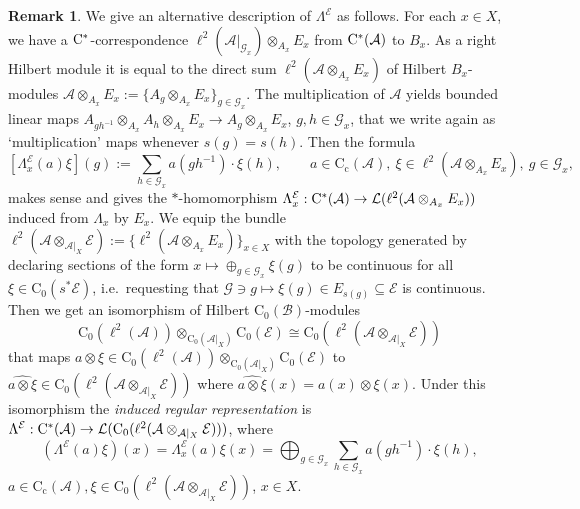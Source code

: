 \documentclass[11 pt, leqno]{amsart}
\numberwithin{equation}{section}
\theoremstyle{plain}
\theoremstyle{definition}
\newtheorem {rem} [thm]{Remark}
\newcommand*{\contc}{\mathrm{C_c}}%
\newcommand*{\contz}{\mathrm{C_0}}%
\newcommand{\B}{\mathcal B}
\newcommand{\LL}{\mathcal L}
\newcommand{\G}{\mathcal G} %
\newcommand{\EE}{\mathcal E}
\newcommand{\A}{\mathcal A}
\newcommand{\cst}{\ifmmode\mathrm{C}^*\else{$\mathrm{C}^*$}\fi}
\begin{document}
\begin{rem}\label{rem:induced_regular_alternative}
We give an alternative description of $\Lambda^{\EE}$ as follows. 
For each $x\in X$, we have a $\cst$-correspondence $\ell^2(\A|_{\G_x})\otimes_{A_x} E_x$ from $\cst(\A)$ to $B_x$. 
As a right Hilbert module it is equal to the direct sum $\ell^2(\A\otimes_{A_x} E_x)$ of Hilbert $B_x$-modules $\A\otimes_{A_x} E_x := \{ A_g\otimes_{A_x}E_x \}_ {g\in \G_x}$. 
The multiplication of $\A$ yields bounded linear maps $A_{gh^{-1}} \otimes_{A_x} A_h \otimes_{A_x} E_x \to A_g \otimes_{A_x} E_x$, $g,h\in \G_x$, that we write again as `multiplication' maps whenever $s(g)=s(h)$. 
Then the formula
\begin{equation}\label{eq:Alcides_formula}
    [\Lambda_{x}^{\EE}(a) \xi](g) := \sum_{h \in \G_x} a(g h^{-1})\cdot \xi(h),\qquad  a\in \contc(\A), \ \xi \in \ell^2(\A\otimes_{A_x} E_x),\ g \in \G_x ,
\end{equation}
makes sense and gives the $*$-homomorphism $\Lambda_{x}^{\EE} : \cst(\A)\to \LL(\ell^2(\A\otimes_{A_x} E_x))$ induced from $\Lambda_x$ by $E_x$. 
We equip the bundle $\ell^2(\A\otimes_{\A|_X} \EE) := \{ \ell^2(\A\otimes_{A_x} E_x)\}_{x\in X}$ with the topology generated by declaring sections of the form $ x\mapsto \oplus_{g\in \G_x}\xi(g)$ to be continuous for all $\xi\in \contz(s^*\EE)$, i.e.\ requesting that $\G\ni g\mapsto \xi(g)\in E_{s(g)}\subseteq \EE$ is continuous. 
Then we get an isomorphism of Hilbert $\contz(\B)$-modules
\[
    \contz(\ell^2(\A)) \otimes_{\contz(\A|_X)} \contz(\EE) \cong \contz(\ell^2(\A\otimes_{\A|_X} \EE))
\]
that maps $a\otimes \xi \in \contz(\ell^2(\A))\otimes_{\contz(\A|_X)}\contz(\EE)$ to $\widehat{a\otimes \xi}\in \contz(\ell^2(\A\otimes_{\A|_X} \EE))$ where $\widehat{a\otimes \xi}(x)=a(x)\otimes \xi(x)$. 
Under this isomorphism the \emph{induced regular representation} is $\Lambda^\EE : \cst(\A)\to \LL(\contz(\ell^2(\A\otimes_{\A|_X} \EE)))$, where
\[
    (\Lambda^\EE(a)\xi)(x) = \Lambda_{x}^{\EE}(a) \xi(x) = \bigoplus_{g\in \G_x}\sum_{h\in \G_x}a(gh^{-1})\cdot\xi(h),
\]
$a\in \contc(\A), \xi\in \contz(\ell^2(\A\otimes_{\A|_X} \EE))$, $x\in X$. 
\end{rem}
\end{document}
